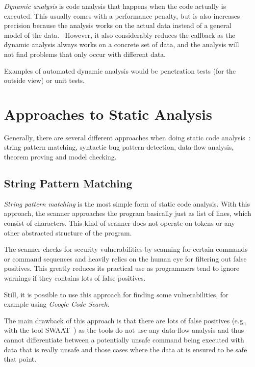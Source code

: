 \emph{Dynamic analysis} is code analysis that happens when the code actually is executed. This usually comes with a performance penalty, but is also increases precision because the analysis works on the actual data instead of a general model of the data.~\cite{chess-west} However, it also considerably reduces the callback as the dynamic analysis always works on a concrete set of data, and the analysis will not find problems that only occur with different data.~\cite{static-code-analysis}

Examples of automated dynamic analysis would be penetration tests (for the outside view) or unit tests.



\section{Approaches to Static Analysis}
Generally, there are several different approaches when doing static code analysis~\cite{comparison-of-bug-finding-tools}: string pattern matching, syntactic bug pattern detection, data-flow analysis, theorem proving and model checking.


\subsection{String Pattern Matching}

\emph{String pattern matching} is the most simple form of static code analysis. With this approach, the scanner approaches the program basically just as list of lines, which consist of characters. This kind of scanner does not operate on tokens or any other abstracted structure of the program.

The scanner checks for security vulnerabilities by scanning for certain commands or command sequences and heavily relies on the human eye for filtering out false positives. This greatly reduces its practical use as programmers tend to ignore warnings if they contains lots of false positives.~\cite{understanding-value}

Still, it is possible to use this approach for finding some vulnerabilities, for example using \emph{Google Code Search}.~\cite{google-code-search}

The main drawback of this approach is that there are lots of false positives (e.g., with the tool SWAAT~\cite{swaat}) as the tools do not use any data-flow analysis and thus cannot differentiate between a potentially unsafe command being executed with data that is really unsafe and those cases where the data at is ensured to be safe that point.

